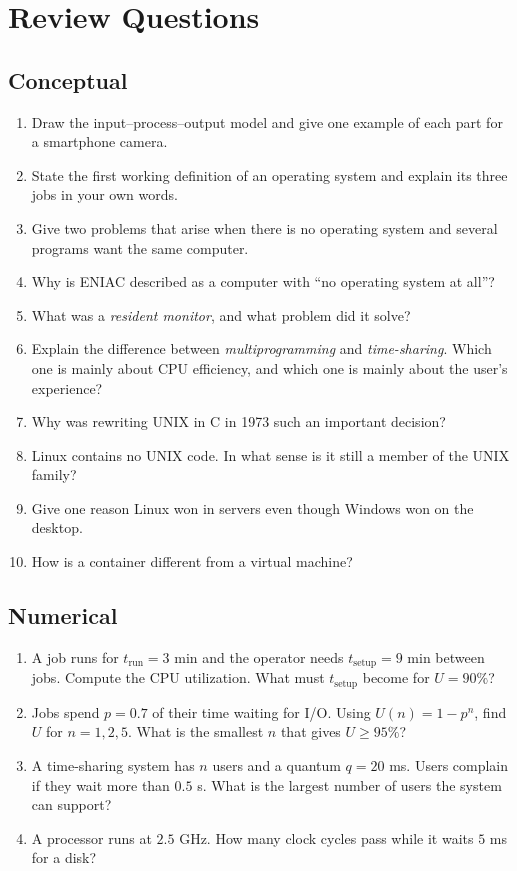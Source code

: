 \documentclass[11pt,a4paper]{article}
\begin{document}
\section{Review Questions}

\subsection*{Conceptual}
\begin{enumerate}[leftmargin=1.6em]
  \item Draw the input--process--output model and give one example of each part for a smartphone camera.
  \item State the first working definition of an operating system and explain its three jobs in your own words.
  \item Give two problems that arise when there is no operating system and several programs want the same computer.
  \item Why is ENIAC described as a computer with ``no operating system at all''?
  \item What was a \emph{resident monitor}, and what problem did it solve?
  \item Explain the difference between \emph{multiprogramming} and \emph{time-sharing}. Which one is mainly about CPU efficiency, and which one is mainly about the user's experience?
  \item Why was rewriting UNIX in C in 1973 such an important decision?
  \item Linux contains no UNIX code. In what sense is it still a member of the UNIX family?
  \item Give one reason Linux won in servers even though Windows won on the desktop.
  \item How is a container different from a virtual machine?
\end{enumerate}

\subsection*{Numerical}
\begin{enumerate}[leftmargin=1.6em,resume]
  \item A job runs for $t_{\text{run}} = 3$ min and the operator needs $t_{\text{setup}} = 9$ min between jobs. Compute the CPU utilization. What must $t_{\text{setup}}$ become for $U = 90\%$?
  \item Jobs spend $p = 0.7$ of their time waiting for I/O. Using $U(n)=1-p^{n}$, find $U$ for $n = 1, 2, 5$. What is the smallest $n$ that gives $U \geq 95\%$?
  \item A time-sharing system has $n$ users and a quantum $q = 20$ ms. Users complain if they wait more than $0.5$ s. What is the largest number of users the system can support?
  \item A processor runs at $2.5$ GHz. How many clock cycles pass while it waits $5$ ms for a disk?
\end{enumerate}
\end{document}
